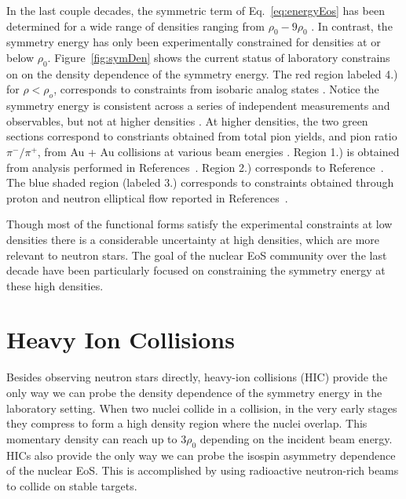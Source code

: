 In the last couple decades, the symmetric term of Eq.~\ref{eq:energyEos} has been determined for a wide range of densities ranging from $\rho_0 - 9\rho_0$ \cite{neutronstar}. In contrast, the symmetry energy has only been experimentally constrained for densities at or below $\rho_0$. Figure~\ref{fig:symDen} shows the current status of laboratory constrains on on the density dependence of the symmetry energy. The red region labeled 4.) for $\rho < \rho_o$, corresponds to constraints from isobaric analog states \cite{dan2014}. Notice the symmetry energy is consistent across  a series of independent measurements and observables, but not at higher densities \cite{awayforward}. At higher densities, the two green sections correspond to constriants obtained from total pion yields, and pion ratio $\pi^-/\pi^+$, from Au + Au collisions at various beam energies \cite{fopi}. Region 1.) is obtained from analysis performed in References~\cite{xia2009,xie2013}. Region 2.) corresponds to Reference~\cite{feng2010}. The blue shaded region (labeled 3.) corresponds to constraints obtained through proton and neutron elliptical flow reported in References~\cite{russo2016,cozma2016,cozma2017}. 

 Though most of the functional forms satisfy the experimental constraints at low densities there is a considerable uncertainty at high densities, which are more relevant to neutron stars. The goal of the nuclear EoS community over the last decade have been particularly focused on constraining the symmetry energy at these high densities. 




\section{Heavy Ion Collisions}
Besides observing neutron stars directly, heavy-ion collisions (HIC) provide the only way we can probe the density dependence of the symmetry energy in the laboratory setting. When two nuclei collide in a collision, in the very early stages they compress to form a high density region where the nuclei overlap. This momentary density can reach up to $3\rho_0$ depending on the incident beam energy. HICs also provide the only way we can probe the isospin asymmetry dependence of the nuclear EoS. This is accomplished by using radioactive neutron-rich beams to collide on stable targets. 


